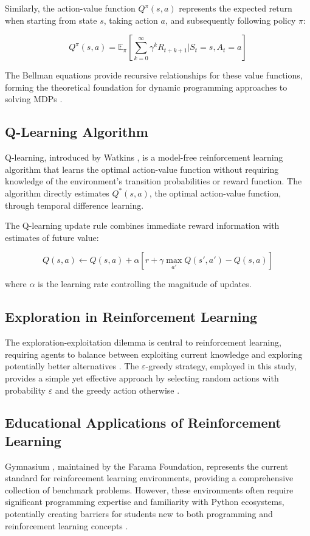 Similarly, the action-value function $Q^\pi(s,a)$ represents the expected return when starting from state $s$, taking action $a$, and subsequently following policy $\pi$:

\begin{equation}
Q^\pi(s,a) = \mathbb{E}_\pi\left[\sum_{k=0}^{\infty} \gamma^k R_{t+k+1} | S_t = s, A_t = a\right]
\end{equation}

The Bellman equations provide recursive relationships for these value functions, forming the theoretical foundation for dynamic programming approaches to solving MDPs \cite{bellman1957}.

\subsection{Q-Learning Algorithm}
Q-learning, introduced by Watkins \cite{watkins1992q}, is a model-free reinforcement learning algorithm that learns the optimal action-value function without requiring knowledge of the environment's transition probabilities or reward function. The algorithm directly estimates $Q^*(s,a)$, the optimal action-value function, through temporal difference learning.

The Q-learning update rule combines immediate reward information with estimates of future value:

\begin{equation}
Q(s,a) \leftarrow Q(s,a) + \alpha \left[r + \gamma \max_{a'} Q(s',a') - Q(s,a)\right]
\end{equation}

where $\alpha$ is the learning rate controlling the magnitude of updates.

\subsection{Exploration in Reinforcement Learning}
The exploration-exploitation dilemma is central to reinforcement learning, requiring agents to balance between exploiting current knowledge and exploring potentially better alternatives \cite{thrun1992efficient}. The $\varepsilon$-greedy strategy, employed in this study, provides a simple yet effective approach by selecting random actions with probability $\varepsilon$ and the greedy action otherwise \cite{sutton2018reinforcement}.

\subsection{Educational Applications of Reinforcement Learning}

Gymnasium \cite{gymnasium2023}, maintained by the Farama Foundation, represents the current standard for reinforcement learning environments, providing a comprehensive collection of benchmark problems. However, these environments often require significant programming expertise and familiarity with Python ecosystems, potentially creating barriers for students new to both programming and reinforcement learning concepts \cite{johnson2020barriers}.